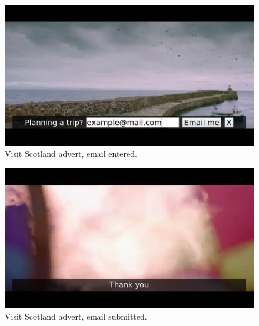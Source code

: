 	\begin{figure}[th]
		\centering
		\includegraphics[width=\textwidth,height=0.5\textheight,keepaspectratio]{images/adverts/visit_scotland-2.png}
		\caption{Visit Scotland advert, email entered.}
		\label{fig:visit_scotland2}
	\end{figure}
	
	\begin{figure}[th]
		\centering
		\includegraphics[width=\textwidth,height=0.5\textheight,keepaspectratio]{images/adverts/visit_scotland-3.png}
		\caption{Visit Scotland advert, email submitted.}
		\label{fig:visit_scotland3}
	\end{figure}